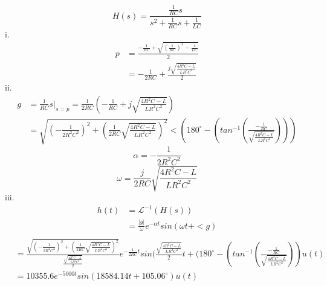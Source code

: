 \documentclass[12pt]{report}
\begin{document}
\begin{equation*}
	H(s) = \frac{\frac{1}{RC}s}{s^2 + \frac{1}{RC}s + \frac{1}{LC}}
\end{equation*}
i.
\begin{align*}
	p &= \frac{-\frac{1}{RC} + \sqrt{(\frac{1}{RC})^2 - \frac{4}{LC}}}{2} \\
	&= -\frac{1}{2RC} + \frac{j\sqrt{\frac{4R^2C-L}{LR^2C^2}}}{2}
\end{align*}
ii. 
\begin{align*}
	g &= \frac{1}{RC}s|_{s=p} = \frac{1}{2RC}(-\frac{1}{RC} + {j\sqrt{\frac{4R^2C-L}{LR^2C^2}}}) \\
	&= \sqrt{(-\frac{1}{2R^2C^2})^2 + (\frac{1}{2RC}\sqrt{\frac{4R^2C-L}{LR^2C^2}})^2} < (180^\circ - (tan^{-1}(\frac{-\frac{1}{RC}}{\sqrt{\frac{4R^2C-L}{LR^2C^2}}})))
\end{align*}
\begin{equation*}
	\alpha = -\frac{1}{2R^2C^2}
\end{equation*}
\begin{equation*}
	\omega = \frac{j}{2RC}\sqrt{\frac{4R^2C-L}{LR^2C^2}}
\end{equation*}
iii.
\begin{align*}
	h(t) &= \mathcal{L}^{-1}(H(s)) \\
	&= \frac{|g|}{\omega}e^{-\alpha t}sin(\omega t + <g)  \\
\end{align*}
\begin{align*}
	&= \frac{\sqrt{(-\frac{1}{2R^2C^2})^2 + (\frac{1}{2RC}\sqrt{\frac{4R^2C-L}{LR^2C^2}})^2}}{\frac{\sqrt{\frac{4R^2C-L}{LR^2C^2}}}{2}}e^{-\frac{1}{2RC}t}sin(\frac{\sqrt{\frac{4R^2C-L}{LR^2C^2}}}{2}t + (180^\circ - (tan^{-1}(\frac{-\frac{1}{RC}}{\sqrt{\frac{4R^2C-L}{LR^2C^2}}}))u(t) \\
	&= 10355.6e^{-5000t}sin(18584.14t + 105.06^\circ)u(t)
\end{align*}
\end{document}
